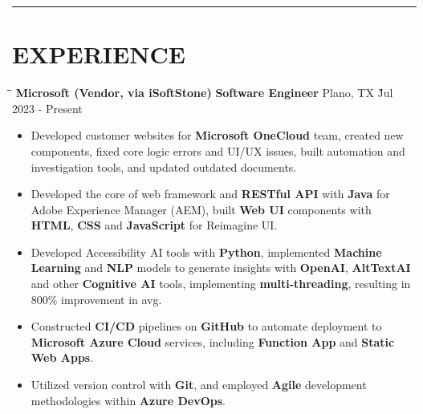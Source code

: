 \documentclass{res}
\begin{document}
\begin{resume}
\vspace{-8pt}
\hspace{-0.55in}
\noindent\rule[0.25\baselineskip]{19.36cm}{0.5pt}    

\vspace{-0.2in}
\section{EXPERIENCE}
    \vspace{0.00in}	
    \begin{tabbing}
    \hspace{3.1in}\= \hspace{1.6in}\= \hspace{1.2in}\= \kill %
    {\bf Microsoft (Vendor, via iSoftStone)} \> {\bf Software Engineer}  \>  
                                    Plano, TX    \` Jul 2023 - Present\\
    \end{tabbing}\vspace{-20pt}      %
    \vspace{+0.1in}
    \begin{itemize} \itemsep 1.5pt %
    \item Developed customer websites for {\bf Microsoft OneCloud} team, created new components, 
        fixed core logic errors and UI/UX issues, built automation and investigation tools, and updated outdated documents.
    \item Developed the core of web framework and {\bf RESTful API} with {\bf Java} for {Adobe Experience Manager (AEM)}, built {\bf Web UI} components with 
        {\bf HTML}, {\bf CSS} and {\bf JavaScript} for Reimagine UI.
    \item Developed Accessibility AI tools with {\bf Python}, implemented {\bf Machine Learning} 
        and {\bf NLP} models to generate insights with {\bf OpenAI}, {\bf AltTextAI} and other 
        {\bf Cognitive AI} tools, implementing {\bf multi-threading}, resulting in 800\% improvement in avg.
    \item Constructed {\bf CI/CD} pipelines on {\bf GitHub} to automate deployment to 
        {\bf Microsoft Azure Cloud} services, including {\bf Function App} and {\bf Static Web Apps}.
    \item Utilized version control with {\bf Git}, and employed {\bf Agile} 
        development methodologies within {\bf Azure DevOps}.
    \end{itemize}



\end{resume}
\end{document}
